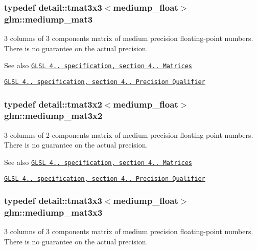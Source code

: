 \subsubsection[{mediump\+\_\+mat3}]{\setlength{\rightskip}{0pt plus 5cm}typedef detail\+::tmat3x3$<$mediump\+\_\+float$>$ {\bf glm\+::mediump\+\_\+mat3}}\label{group__core__precision_gab9f55249d1c065a72d525f3ffd3524be}
3 columns of 3 components matrix of medium precision floating-\/point numbers. There is no guarantee on the actual precision.

\begin{DoxySeeAlso}{See also}
\href{http://www.opengl.org/registry/doc/GLSLangSpec.4.20.8.pdf}{\tt G\+L\+S\+L 4.. specification, section 4.. Matrices} 

\href{http://www.opengl.org/registry/doc/GLSLangSpec.4.20.8.pdf}{\tt G\+L\+S\+L 4.. specification, section 4.. Precision Qualifier} 
\end{DoxySeeAlso}
\hypertarget{group__core__precision_ga74c660239e7f6b76796f1b4990083ec6}{}
\subsubsection[{mediump\+\_\+mat3x2}]{\setlength{\rightskip}{0pt plus 5cm}typedef detail\+::tmat3x2$<$mediump\+\_\+float$>$ {\bf glm\+::mediump\+\_\+mat3x2}}\label{group__core__precision_ga74c660239e7f6b76796f1b4990083ec6}
3 columns of 2 components matrix of medium precision floating-\/point numbers. There is no guarantee on the actual precision.

\begin{DoxySeeAlso}{See also}
\href{http://www.opengl.org/registry/doc/GLSLangSpec.4.20.8.pdf}{\tt G\+L\+S\+L 4.. specification, section 4.. Matrices} 

\href{http://www.opengl.org/registry/doc/GLSLangSpec.4.20.8.pdf}{\tt G\+L\+S\+L 4.. specification, section 4.. Precision Qualifier} 
\end{DoxySeeAlso}
\hypertarget{group__core__precision_ga21bb45bd57a97bf7b0b41e86328d72b2}{}
\subsubsection[{mediump\+\_\+mat3x3}]{\setlength{\rightskip}{0pt plus 5cm}typedef detail\+::tmat3x3$<$mediump\+\_\+float$>$ {\bf glm\+::mediump\+\_\+mat3x3}}\label{group__core__precision_ga21bb45bd57a97bf7b0b41e86328d72b2}
3 columns of 3 components matrix of medium precision floating-\/point numbers. There is no guarantee on the actual precision.


